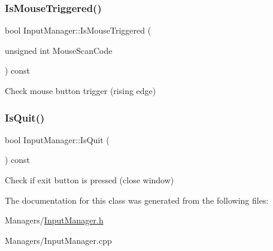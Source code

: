 \subsubsection{\texorpdfstring{Is\+Mouse\+Triggered()}{IsMouseTriggered()}}
{\footnotesize\ttfamily bool Input\+Manager\+::\+Is\+Mouse\+Triggered (\begin{DoxyParamCaption}\item[{unsigned int}]{Mouse\+Scan\+Code }\end{DoxyParamCaption}) const}

Check mouse button trigger (rising edge) \mbox{\label{classInputManager_a926e42475408a078ebe5395f95289df2}} 
\subsubsection{\texorpdfstring{Is\+Quit()}{IsQuit()}}
{\footnotesize\ttfamily bool Input\+Manager\+::\+Is\+Quit (\begin{DoxyParamCaption}{ }\end{DoxyParamCaption}) const}

Check if exit button is pressed (close window) 

The documentation for this class was generated from the following files\+:\begin{DoxyCompactItemize}
\item 
Managers/\hyperlink{InputManager_8h}{Input\+Manager.\+h}\item 
Managers/Input\+Manager.\+cpp\end{DoxyCompactItemize}
